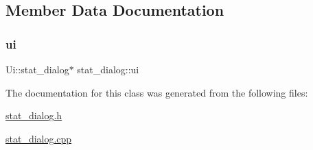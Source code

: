 \subsection{Member Data Documentation}
\mbox{\label{classstat__dialog_a698af1b38fe457968baa821f106d0563}} 
\subsubsection{\texorpdfstring{ui}{ui}}
{\footnotesize\ttfamily Ui\+::stat\+\_\+dialog$\ast$ stat\+\_\+dialog\+::ui\hspace{0.3cm}{\ttfamily [private]}}



The documentation for this class was generated from the following files\+:\begin{DoxyCompactItemize}
\item 
\mbox{\hyperlink{stat__dialog_8h}{stat\+\_\+dialog.\+h}}\item 
\mbox{\hyperlink{stat__dialog_8cpp}{stat\+\_\+dialog.\+cpp}}\end{DoxyCompactItemize}
